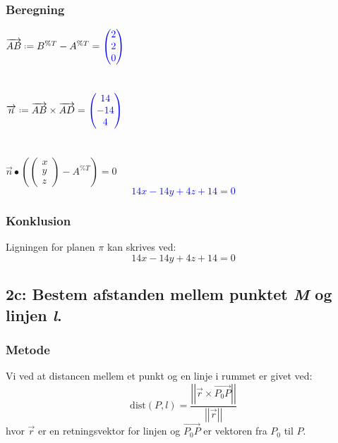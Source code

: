 \documentclass[../main.tex]{subfiles}
\begin{document}
    \subsubsection*{Beregning}
        \(\overrightarrow{AB} \defeq B^{\%T} - A^{\%T}=\textcolor{blue}{\begin{pmatrix} 2 \\ 2 \\ 0 \end{pmatrix}}\)\\\\\\
        \(\overrightarrow{n} \defeq \overrightarrow{AB} \times \overrightarrow{AD} = \textcolor{blue}{\begin{pmatrix} 14 \\ -14 \\ 4 \end{pmatrix}}\)\\\\\\
        \(\overrightarrow{n}\bullet \left(\begin{pmatrix} x \\ y \\ z \end{pmatrix}-A^{\%T}\right)=0\)
        \textcolor{blue}{\[14x-14y+4z+14=0\]}
        \subsubsection*{Konklusion}
            Ligningen for planen \(\pi\) kan skrives ved:
            \[14x-14y+4z+14=0\]
\clearpage
\subsection*{2c: Bestem afstanden mellem punktet \textit{M} og linjen \textit{l}.}
    \subsubsection*{Metode}
        Vi ved at distancen mellem et punkt og en linje i rummet er givet ved:
        \[\text{dist}(P,l)=\frac{\left|\left| \overrightarrow{r} \times \overrightarrow{P_0 P}\right|\right|}{\left|\left|\overrightarrow{r} \right|\right|}\]
        hvor \(\overrightarrow{r}\) er en retningsvektor for linjen og \(\overrightarrow{P_0 P}\) er vektoren fra \(P_0\) til \(P\).
\end{document}
